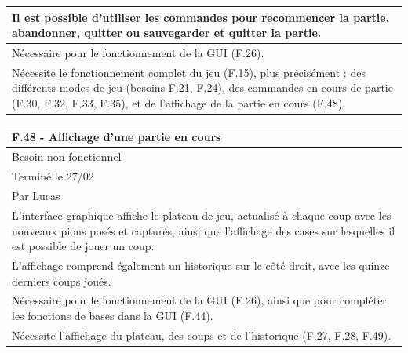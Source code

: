 \documentclass[a4paper,12pt]{article}
\begin{document}
\begin{tabularx}{\textwidth}{|X|}
    Il est possible d’utiliser les commandes pour recommencer la partie, abandonner, quitter ou sauvegarder et quitter la partie.                                                                                                      \\
    \hline
    Nécessaire pour le fonctionnement de la GUI (F.26).                                                                                                                                                                                \\
    Nécessite le fonctionnement complet du jeu (F.15), plus précisément : des différents modes de jeu (besoins F.21, F.24), des commandes en cours de partie (F.30, F.32, F.33, F.35), et de l’affichage de la partie en cours (F.48). \\
    \hline
\end{tabularx}

\vspace{1cm}

\noindent
\setlength{\arrayrulewidth}{1.5pt}
\renewcommand{\arraystretch}{1.5}
\begin{tabularx}{\textwidth}{|X|}
    \hline
    \textbf{F.48 - Affichage d’une partie en cours}                                                                                                                                                      \\
    \hline
    Besoin non fonctionnel                                                                                                                                                                               \\
    \hline
    Terminé le 27/02                                                                                                                                                                                     \\
    Par Lucas                                                                                                                                                                                            \\
    \hline
    L’interface graphique affiche le plateau de jeu, actualisé à chaque coup avec les nouveaux pions posés et capturés, ainsi que l’affichage des cases sur lesquelles il est possible de jouer un coup. \\
    L’affichage comprend également un historique sur le côté droit, avec les quinze derniers coups joués.                                                                                                \\
    \hline
    Nécessaire pour le fonctionnement de la GUI (F.26), ainsi que pour compléter les fonctions de bases dans la GUI (F.44).                                                                              \\
    Nécessite l’affichage du plateau, des coups et de l’historique (F.27, F.28, F.49).                                                                                                                   \\
    \hline
\end{tabularx}
\end{document}
